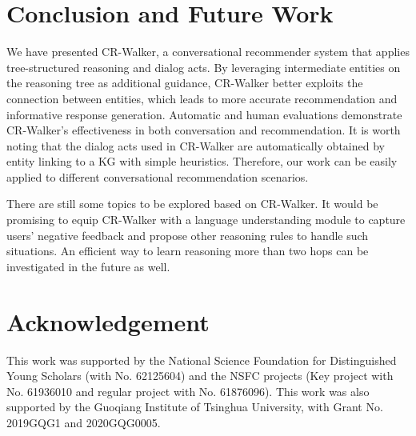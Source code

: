 \documentclass[11pt]{article}
\begin{document}
\section{Conclusion and Future Work}
We have presented CR-Walker, a conversational recommender system that applies tree-structured reasoning and dialog acts. By leveraging intermediate entities on the reasoning tree as additional guidance, CR-Walker better exploits the connection between entities, which leads to more accurate recommendation and informative response generation. Automatic and human evaluations demonstrate CR-Walker's effectiveness in both conversation and recommendation. It is worth noting that the dialog acts used in CR-Walker are automatically obtained by entity linking to a KG with simple heuristics. Therefore, our work can be easily applied to different conversational recommendation scenarios.

There are still some topics to be explored based on CR-Walker. It would be promising to equip CR-Walker with a language understanding module to capture users' negative feedback and propose other reasoning rules to handle such situations. An efficient way to learn reasoning more than two hops can be investigated in the future as well.

\section*{Acknowledgement}
This work was supported by the National Science Foundation for Distinguished Young Scholars (with No. 62125604) and the NSFC projects (Key project with No. 61936010 and regular project with No. 61876096). This work was also supported by the Guoqiang Institute of Tsinghua University, with Grant No. 2019GQG1 and 2020GQG0005.




\newpage
\appendix
\end{document}
